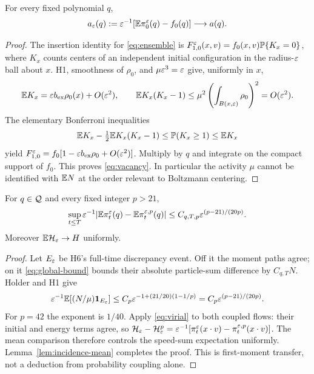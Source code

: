 \begin{lemma}\label{lem:vacancy}
For every fixed polynomial $q$,
\begin{equation}\label{eq:vacancy}
 a_\varepsilon(q):=\varepsilon^{-1}[\mathbb E\pi_0^\varepsilon(q)-f_0(q)]\longrightarrow a(q).
\end{equation}
\end{lemma}
\begin{proof}
The insertion identity for \eqref{eq:ensemble} is
$F_{1,0}^\varepsilon(x,v)=f_0(x,v)\mathbb P\{K_x=0\}$, where $K_x$ counts centers
of an independent initial configuration in the radius-$\varepsilon$ ball about $x$.
H1, smoothness of $\rho_0$, and $\mu\varepsilon^3=\varepsilon$ give, uniformly in $x$,
\[
 \mathbb E K_x=\varepsilon b_{\rm ex}\rho_0(x)+O(\varepsilon^2),\qquad
 \mathbb E K_x(K_x-1)\le\mu^2\left(\int_{B(x,\varepsilon)}\rho_0\right)^2
                                                   =O(\varepsilon^2).
\]
The elementary Bonferroni inequalities
\[
 \mathbb E K_x-\tfrac12\mathbb E K_x(K_x-1)
                 \le\mathbb P(K_x\ge1)\le\mathbb E K_x
\]
yield
$F_{1,0}^\varepsilon=f_0[1-\varepsilon b_{\rm ex}\rho_0+O(\varepsilon^2)]$.
Multiply by $q$ and integrate on the compact support of $f_0$.
This proves \eqref{eq:vacancy}. In particular the activity $\mu$ cannot
be identified with $\mathbb E N$ at the order relevant to Boltzmann centering.
\end{proof}

\begin{lemma}\label{lem:mean-transfer}
For $q\in\mathcal Q$ and every fixed integer $p>21$,
\begin{equation}\label{eq:mean-transfer}
 \sup_{t\le T}\varepsilon^{-1}
  |\mathbb E\pi_t^\varepsilon(q)-\mathbb E\pi_t^{\varepsilon,p}(q)|
                      \le C_{q,T,p}\varepsilon^{(p-21)/(20p)}.
\end{equation}
Moreover $\mathbb E\mathcal H_\varepsilon\to H$ uniformly.
\end{lemma}
\begin{proof}
Let $E_\varepsilon$ be H6's full-time discrepancy event. Off it the moment paths
agree; on it \eqref{eq:global-bound} bounds their absolute particle-sum
difference by $C_{q,T}N$. Holder and H1 give
\[
 \varepsilon^{-1}\mathbb E[(N/\mu)\mathbf 1_{E_\varepsilon}]
 \le C_p\varepsilon^{-1+(21/20)(1-1/p)}
 =C_p\varepsilon^{(p-21)/(20p)}.
\]
For $p=42$ the exponent is $1/40$. Apply \eqref{eq:virial} to both
coupled flows: their initial and energy terms agree, so
$\mathcal H_\varepsilon-\mathcal H_\varepsilon^p=\varepsilon^{-1}
[\pi_t^\varepsilon(x\cdot v)-\pi_t^{\varepsilon,p}(x\cdot v)]$.
The mean comparison therefore controls the speed-sum expectation uniformly.
Lemma~\ref{lem:incidence-mean} completes the proof. This is first-moment
transfer, not a deduction from probability coupling alone.
\end{proof}
